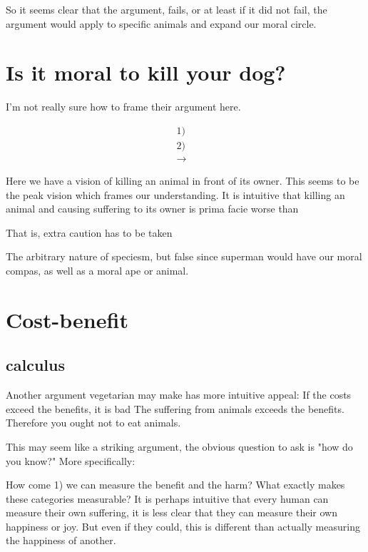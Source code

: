 So it seems clear that the argument, fails, or at least if it did not fail, the argument would apply to specific animals and expand our moral circle. 

\section{Is it moral to kill your dog?}

I'm not really sure how to frame their argument here. 

\begin{mdframed}[style=MyFrame]
\begin{align*}
1)& \text{} \\
2)& \text{} \\
\rightarrow& \text{}
\end{align*}
\end{mdframed}

Here we have a vision of killing an animal in front of its owner. This seems to be the peak vision which frames our understanding. It is intuitive that killing an animal and causing suffering to its owner is prima facie worse than 


That is, extra caution has to be taken

The arbitrary nature of speciesm, but false since superman would have our moral compas, as well as a moral ape or animal. 

\section{Cost-benefit}

\subsection{calculus}

Another argument vegetarian may make has more intuitive appeal:
If the costs exceed the benefits, it is bad
The suffering from animals exceeds the benefits.
Therefore you ought not to eat animals. 

This may seem like a striking argument, the obvious question to ask is "how do you know?" More specifically:

How come 1) we can measure the benefit and the harm? What exactly makes these categories measurable? It is perhaps intuitive that every human can measure their own suffering, it is less clear that they can measure their own happiness or joy. But even if they could, this is different than actually measuring the happiness of another. 

